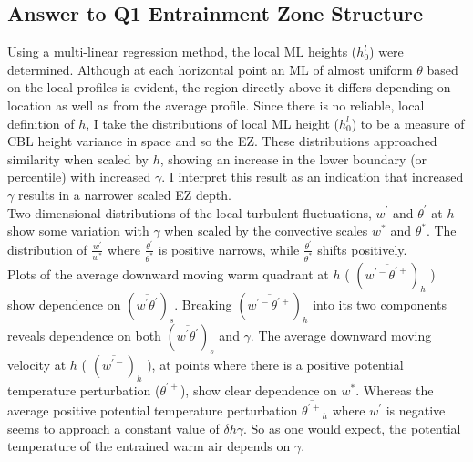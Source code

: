 \subsection{Answer to Q1 Entrainment Zone Structure}

Using a multi-linear regression method, the local \acs{ML} heights ($h^{l}_{0}$) 
were determined.  Although at each horizontal point an \acs{ML} of almost uniform $\theta$ based on the local profiles is evident, the region directly above it differs depending on location as well as from the average profile. 
Since there is no reliable, local definition of $h$, 
I take the distributions of local \acs{ML} height ($h^{l}_{0}$) to be a measure of \acs{CBL} height variance in space and so the \acs{EZ}.
 These distributions approached similarity when scaled by $h$, showing an increase in the lower 
boundary (or percentile) with increased $\gamma$.  I interpret this result as an indication that increased $\gamma$ results in a narrower scaled \acs{EZ} depth.\\

Two dimensional distributions of the local turbulent fluctuations, $w^{'}$ and $\theta^{'}$ at $h$ show some variation with $\gamma$ when scaled by the convective scales $w^{*}$ and $\theta^{*}$.  The distribution of $\frac{w^{'}}{w^{*}}$ where $\frac{\theta^{'}}{\theta^{*}}$ is positive narrows, while $\frac{\theta^{'}}{\theta^{*}}$ shifts positively.\\

Plots of the average downward moving warm quadrant at $h$ ( $(\overline{w^{'-}\theta^{'+}})_{h}$ ) show dependence on $(\overline{w^{'}\theta^{'}})_{s}$. Breaking $(\overline{w^{'-}\theta^{'+}})_{h}$ into its two components reveals dependence on both $(\overline{w^{'}\theta^{'}})_{s}$ and $\gamma$. The average downward moving velocity at $h$ ( $(\overline{w^{'-}})_{h}$ ), at points where there is a positive potential temperature perturbation ($\theta^{'+}$), show clear dependence on $w^{*}$.  Whereas the average positive potential temperature perturbation $\overline{\theta^{'+}}_{h}$ where $w^{'}$ is negative seems to approach a constant value of $\delta h \gamma$. So as one would expect, the potential temperature of the entrained warm air depends on $\gamma$.

\clearpage


